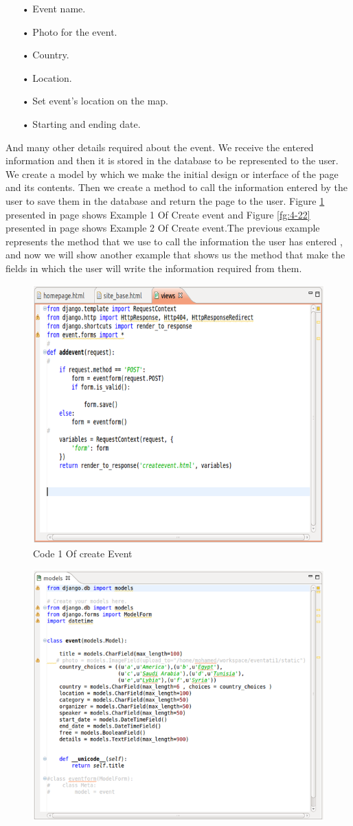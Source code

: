 \documentclass[12pt,a4paper,class,twoside,openany]{report}
\begin{document}
{\begin{itemize}
\item[•] Event name.
\item[•] Photo for the event.
\item[•] Country.
\item[•] Location.
\item[•] Set event's location on the map.
\item[•] Starting and ending date.
\end{itemize}
  	And many other details required about the event.
	We receive the entered information and then it is stored in the database to be represented to the user. We create a model by which we make the initial design or interface of the page and its contents. Then we create a method to call the information entered by the user to save them in the database and return the page to the user.
Figure \ref{fg:4-21} presented in page \pageref{fg:4-21} shows Example 1 Of Create event and
Figure \ref{fg:4-22} presented in page \pageref{fg:4-22} shows Example 2 Of Create event.The previous example represents the method that we use to call the information the user has entered , and now we will show another example that shows us the method that make the fields in which the user will write the information required from them.
\begin{figure}
\begin{center}
\includegraphics[height=3.5 in]{4-21}
\caption{Code 1 Of create Event}
\label{fg:4-21}
\end{center}
\end{figure}
\begin{figure}
\begin{center}
\includegraphics[height=3 in]{4-22}

\end{center}
\end{figure}}
\end{document}
